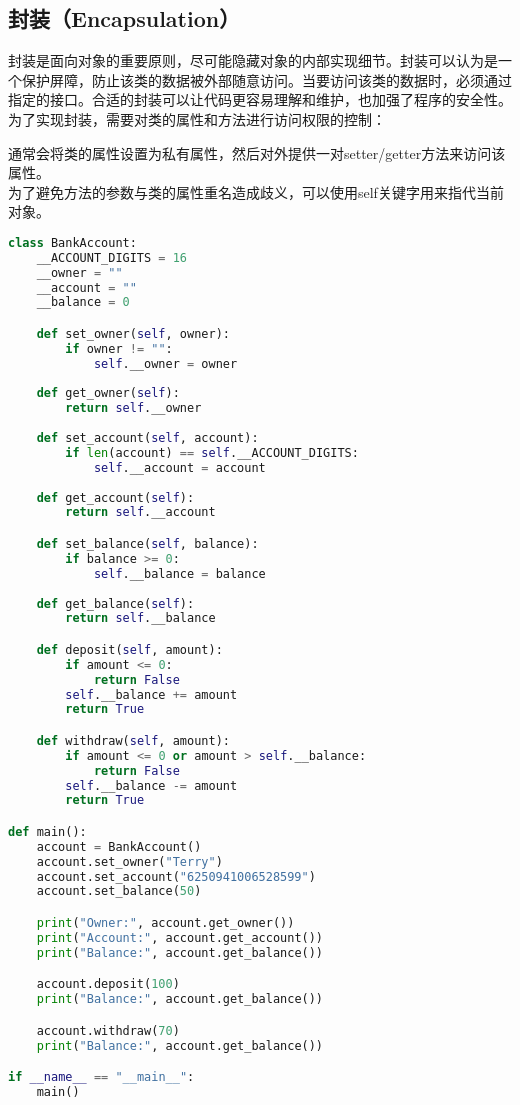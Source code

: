 \vspace{0.5cm}

\subsection{封装（Encapsulation）}

封装是面向对象的重要原则，尽可能隐藏对象的内部实现细节。封装可以认为是一个保护屏障，防止该类的数据被外部随意访问。当要访问该类的数据时，必须通过指定的接口。合适的封装可以让代码更容易理解和维护，也加强了程序的安全性。\\

为了实现封装，需要对类的属性和方法进行访问权限的控制：

通常会将类的属性设置为私有属性，然后对外提供一对setter/getter方法来访问该属性。\\

为了避免方法的参数与类的属性重名造成歧义，可以使用self关键字用来指代当前对象。\\


\begin{lstlisting}[language=Python]
class BankAccount:
    __ACCOUNT_DIGITS = 16
    __owner = ""
    __account = ""
    __balance = 0

    def set_owner(self, owner):
        if owner != "":
            self.__owner = owner
    
    def get_owner(self):
        return self.__owner
    
    def set_account(self, account):
        if len(account) == self.__ACCOUNT_DIGITS:
            self.__account = account
    
    def get_account(self):
        return self.__account

    def set_balance(self, balance):
        if balance >= 0:
            self.__balance = balance
    
    def get_balance(self):
        return self.__balance

    def deposit(self, amount):
        if amount <= 0:
            return False
        self.__balance += amount
        return True

    def withdraw(self, amount):
        if amount <= 0 or amount > self.__balance:
            return False
        self.__balance -= amount
        return True

def main():
    account = BankAccount()
    account.set_owner("Terry")
    account.set_account("6250941006528599")
    account.set_balance(50)

    print("Owner:", account.get_owner())
    print("Account:", account.get_account())
    print("Balance:", account.get_balance())

    account.deposit(100)
    print("Balance:", account.get_balance())

    account.withdraw(70)
    print("Balance:", account.get_balance())

if __name__ == "__main__":
    main()
\end{lstlisting}

